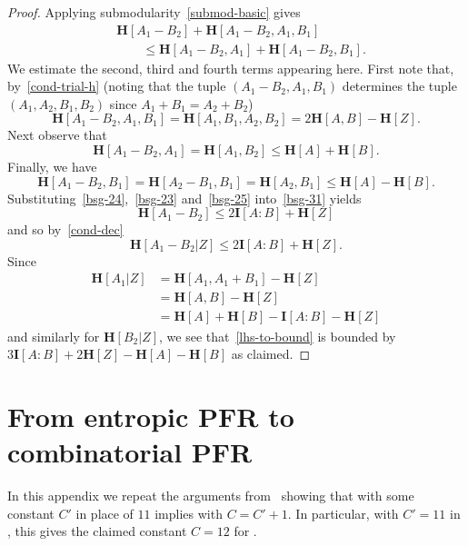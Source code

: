 \documentclass[12pt,reqno,tbtags]{amsart}
\theoremstyle{definition}
\theoremstyle{remark}
\renewcommand{\leq}{\leqslant}
\newcommand{\ent}[1]{\mathbf{H}[#1]}
\newcommand{\I}[1]{\mathbf{I}[#1]}
\numberwithin{equation}{section}
\begin{document}
\begin{proof}
Applying submodularity~\eqref{submod-basic} gives
\begin{equation}\label{bsg-31} \begin{split}
&\ent{A_1 - B_2} + \ent{A_1 - B_2, A_1, B_1} \\
&\qquad \leq \ent{A_1 - B_2, A_1} + \ent{A_1 - B_2,B_1}.
\end{split}\end{equation}
We estimate the second, third and fourth terms appearing here.
First note that, by~\eqref{cond-trial-h} (noting that the tuple $(A_1 - B_2, A_1, B_1)$  determines the tuple $(A_1, A_2, B_1, B_2)$ since $A_1+B_1=A_2+B_2$)
\begin{equation}\label{bsg-24} \ent{A_1 - B_2, A_1, B_1} = \ent{A_1, B_1, A_2, B_2} = 2\ent{A,B} - \ent{Z}.\end{equation}
Next observe that
\begin{equation}\label{bsg-23} \ent{A_1 - B_2, A_1} = \ent{A_1, B_2} \leq \ent{A} + \ent{B}.
\end{equation}
Finally, we have
\begin{equation}\label{bsg-25} \ent{A_1 - B_2, B_1} = \ent{A_2 - B_1, B_1} = \ent{A_2, B_1} \leq \ent{A} - \ent{B}.\end{equation}
Substituting~\eqref{bsg-24},~\eqref{bsg-23} and~\eqref{bsg-25} into~\eqref{bsg-31} yields
\[ \ent{A_1 - B_2} \leq 2\I{A:B} + \ent{Z}\] and so by~\eqref{cond-dec}
\[\ent{A_1 - B_2 | Z}  \leq 2\I{A:B} + \ent{Z}.\]
Since
\begin{align*} \ent{A_1 | Z} & = \ent{A_1, A_1 + B_1} - \ent{Z} \\ & = \ent{A,B} - \ent{Z} \\ & = \ent{A} + \ent{B} - \I{A:B} - \ent{Z}\end{align*}
and similarly for $\ent{B_2 | Z}$, we see that~\eqref{lhs-to-bound} is bounded by
$3\I{A:B} + 2\ent{Z}-\ent{A}-\ent{B}$ as claimed.
\end{proof}

\section{From entropic PFR to combinatorial PFR}\label{equiv-app}
In this appendix we repeat the arguments from~\cite{gmt} showing that  with some constant $C'$ in place of $11$ implies  with $C=C'+1$.
In particular, with $C'=11$ in , this gives the claimed constant $C=12$ for .
\end{document}
